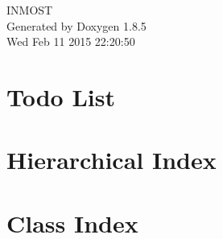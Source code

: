 \documentclass[twoside]{book}
\newcommand{\clearemptydoublepage}{%
  \newpage{\pagestyle{empty}\cleardoublepage}%
}
\begin{document}
\hypersetup{pageanchor=false}
\begin{titlepage}
\vspace*{7cm}
\begin{center}%
{\Large I\-N\-M\-O\-S\-T }\\
\vspace*{1cm}
{\large Generated by Doxygen 1.8.5}\\
\vspace*{0.5cm}
{\small Wed Feb 11 2015 22:20:50}\\
\end{center}
\end{titlepage}
\clearemptydoublepage
\tableofcontents
\clearemptydoublepage
{}
\hypersetup{pageanchor=true}

\chapter{Todo List}
\label{todo}
\hypertarget{todo}{}

\chapter{Hierarchical Index}

\chapter{Class Index}

\end{document}
